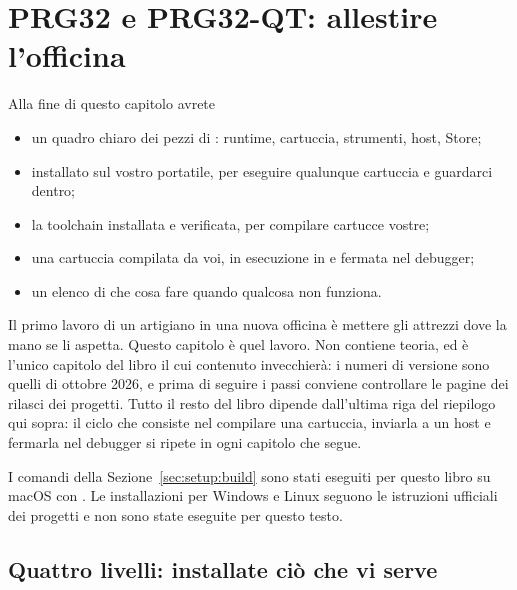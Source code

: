\chapter{PRG32 e PRG32-QT: allestire l'officina}
\label{ch:setup}


\begin{chapgoals}
Alla fine di questo capitolo avrete
\begin{itemize}
\item un quadro chiaro dei pezzi di \prg: runtime, cartuccia, strumenti, host, Store;
\item \prgqt installato sul vostro portatile, per eseguire qualunque cartuccia e guardarci dentro;
\item la toolchain \riscv installata e verificata, per compilare cartucce vostre;
\item una cartuccia compilata da voi, in esecuzione in \prgqt e fermata nel debugger;
\item un elenco di che cosa fare quando qualcosa non funziona.
\end{itemize}
\end{chapgoals}


Il primo lavoro di un artigiano in una nuova officina è mettere gli attrezzi
dove la mano se li aspetta. Questo capitolo è quel lavoro. Non contiene teoria,
ed è l'unico capitolo del libro il cui contenuto invecchierà: i numeri di
versione sono quelli di ottobre 2026, e prima di seguire i passi conviene
controllare le pagine dei rilasci dei progetti. Tutto il resto del libro
dipende dall'ultima riga del riepilogo qui sopra: il ciclo che consiste nel
compilare una cartuccia, inviarla a un host e fermarla nel debugger si ripete
in ogni capitolo che segue.

I comandi della Sezione~\ref{sec:setup:build} sono stati eseguiti per questo
libro su macOS con \prgqt. Le installazioni per Windows e Linux seguono le
istruzioni ufficiali dei progetti e non sono state eseguite per questo testo.

\section{Quattro livelli: installate ciò che vi serve}

